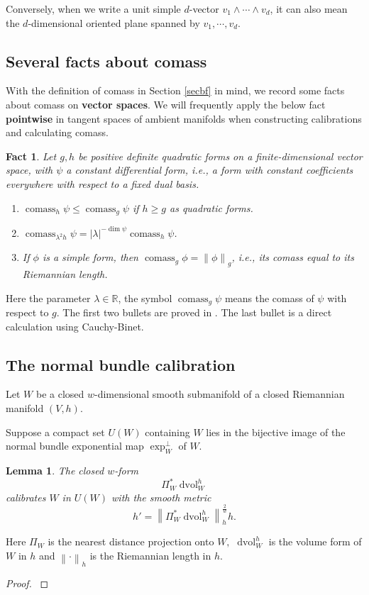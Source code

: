 \documentclass[11pt,a4paper]{amsart}
\numberwithin{equation}{section}
\newcommand{\lam}{\lambda}
\newcommand{\cms}{\operatorname{comass}}
\newcommand{\cd}{\cdots}
\newcommand{\no}[1]{\left\lVert#1\right\rVert}
\newcommand{\dvol}{\operatorname{dvol}}
\newcommand{\du}{^\ast}
\newcommand{\w}{\wedge}
\newcommand{\R}{\mathbb{R}}
\theoremstyle{plain}
\newtheorem{lem}[exam]{Lemma}
\newtheorem{fact}[exam]{Fact}
\theoremstyle{definition}
\numberwithin{equation}{subsection}
\begin{document}
	Conversely, when we write a unit simple $d$-vector $v_1\w\cd\w v_d$, it can also mean the $d$-dimensional oriented plane spanned by $v_1,\cd,v_d.$
	\subsection{Several facts about comass}
	With the definition of comass in Section \ref{secbf} in mind, we record some facts about comass on \textbf{vector spaces}. We will frequently apply the below fact \textbf{pointwise} in tangent spaces of ambient manifolds when constructing calibrations and calculating comass.
	\begin{fact}\label{cmsvec}
		Let $g,h$ be positive definite quadratic forms on a finite-dimensional vector space, with $\psi$ a constant differential form, i.e., a form with constant coefficients everywhere with respect to a fixed dual basis.\begin{enumerate}
			\item $\cms_h\psi\le\cms_g\psi$ if $h\ge g$ as quadratic forms.\label{cms1}
			\item $\cms_{\lam^2 h}\psi=|\lam|^{-\dim\psi}\cms_h\psi$.\label{cms2}
			\item If $\phi$ is a simple form, then $\cms_g\phi=\no{\phi}_g$, i.e., its comass equal to its Riemannian length.\label{cms0}
		\end{enumerate}
	\end{fact}
	Here the parameter $\lam\in \R$, the symbol
	$\cms_g\psi$ means the comass of $\psi$ with respect to $g$. The first two bullets are proved in \cite[Lemma 2.1.9, 2.1.20]{YZt}. The last bullet is a direct calculation using Cauchy-Binet.
	\subsection{The normal bundle calibration}\label{secnb}
	Let $W$ be a closed $w$-dimensional smooth submanifold of a closed Riemannian manifold $(V,h).$
	
	Suppose a compact set $U(W)$ containing $W$ lies in the bijective image of the normal bundle exponential map $\exp^\perp_W$ of $W.$
	\begin{lem}\label{lemznb}
		The closed $w$-form $$\Pi_W\du\dvol_W^h$$ calibrates $W$ in $U(W)$ with the smooth metric $$h'=\no{\Pi_W\du\dvol_W^h}_h^{\frac{2}{w}}h.$$
	\end{lem}
	Here $\Pi_W$ is the nearest distance projection onto $W,$ $\dvol_W^h$ is the volume form of $W$ in $h$ and $\no{\cdot}_h$ is the Riemannian length in $h.$
	\begin{proof}
		\cite[Lemma 2.4]{ZLa}\end{proof}
\end{document}
